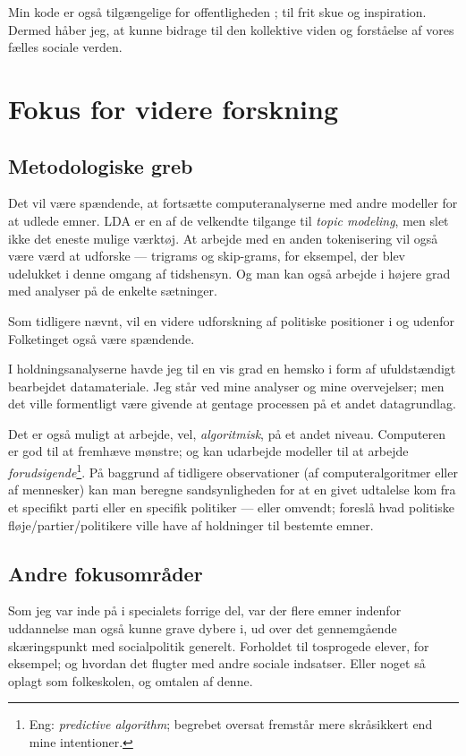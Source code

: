 Min kode er også tilgængelige for offentligheden \autocite{andersenNorseghostMasterThesis2020}; til frit skue og inspiration.
Dermed håber jeg, at kunne bidrage til den kollektive viden og forståelse af vores fælles sociale verden.

\chapter{Fokus for videre forskning}

\section{Metodologiske greb}
Det vil være spændende, at fortsætte computeranalyserne med andre modeller for at udlede emner.
LDA er en af de velkendte tilgange til \textit{topic modeling}, men slet ikke det eneste mulige værktøj.
At arbejde med en anden tokenisering vil også være værd at udforske — 
trigrams og skip-grams, for eksempel, der blev udelukket i denne omgang af tidshensyn.
Og man kan også arbejde i højere grad med analyser på de enkelte sætninger.

Som tidligere nævnt, vil en videre udforskning af politiske positioner i og udenfor Folketinget også være spændende.

I holdningsanalyserne havde jeg til en vis grad en hemsko i form af ufuldstændigt bearbejdet datamateriale.
Jeg står ved mine analyser og mine overvejelser; men det ville formentligt være givende at gentage processen på et andet datagrundlag.

Det er også muligt at arbejde, vel, \textit{algoritmisk}, på et andet niveau.
Computeren er god til at fremhæve mønstre;
og kan udarbejde modeller til at arbejde \textit{forudsigende}\footnote{Eng: \textit{predictive algorithm}; begrebet oversat fremstår mere skråsikkert end mine intentioner.}.
På baggrund af tidligere observationer
(af computeralgoritmer eller af mennesker)
kan man beregne sandsynligheden for at en givet udtalelse kom fra et specifikt parti eller en specifik politiker —
eller omvendt; foreslå hvad politiske fløje/partier/politikere ville have af holdninger til bestemte emner.

\section{Andre fokusområder}
Som jeg var inde på i specialets forrige del, var der flere emner indenfor uddannelse man også kunne grave dybere i, ud over det gennemgående skæringspunkt med socialpolitik generelt.
Forholdet til tosprogede elever, for eksempel; og hvordan det flugter med andre sociale indsatser.
Eller noget så oplagt som folkeskolen, og omtalen af denne.

